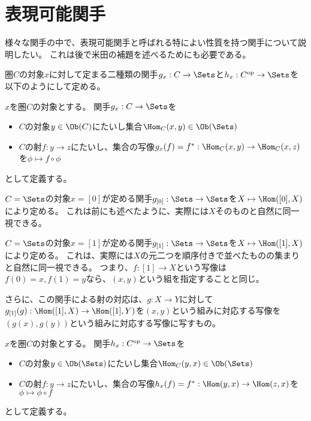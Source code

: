 \documentclass[uplatex]{jsarticle}
\begin{document}
\section{表現可能関手}
様々な関手の中で、表現可能関手と呼ばれる特によい性質を持つ関手について説明したい。
これは後で米田の補題を述べるためにも必要である。

圏$C$の対象$x$に対して定まる二種類の関手$g_x:C \to \Sets$と$h_x:C^{\rm op} \to \Sets$を以下のようにして定める。

\begin{dfn}
$x$を圏$C$の対象とする。
関手$g_x:C\to \Sets$を
\begin{itemize}
\item $C$の対象$y\in\Ob(C)$にたいし集合$\Hom_C(x,y)\in\Ob(\Sets)$
\item $C$の射$f:y\to z$にたいし、集合の写像$g_x(f)=f^*:\Hom_C(x,y)\to\Hom_C(x,z)$を$\phi\mapsto f\circ\phi$
\end{itemize}
として定義する。
\end{dfn}

\begin{eg}
$C=\Sets$の対象$x=[0]$が定める関手$g_{[0]}:\Sets \to \Sets$を$X \mapsto \Hom([0], X)$により定める。
これは前にも述べたように、実際には$X$そのものと自然に同一視できる。
\end{eg}

\begin{eg}
$C=\Sets$の対象$x=[1]$が定める関手$g_{[1]}:\Sets \to \Sets$を$X \mapsto \Hom([1], X)$により定める。
これは、実際には$X$の元二つを順序付きで並べたものの集まりと自然に同一視できる。
つまり、$f:[1] \to X$という写像は$f(0)=x, f(1)=y$なら、$(x,y)$という組を指定することと同じ。

さらに、この関手による射の対応は、$g:X \to Y$に対して$g_{[1]}(g):\Hom([1], X) \to \Hom([1], Y)$を$(x,y)$という組みに対応する写像を$(g(x), g(y))$という組みに対応する写像に写すもの。
\end{eg}

\begin{dfn}
$x$を圏$C$の対象とする。
関手$h_x:C^{\rm op}\to \Sets$を
\begin{itemize}
\item $C$の対象$y\in\Ob(\Sets)$にたいし集合$\Hom_C(y,x)\in\Ob(\Sets)$
\item $C$の射$f:y\to z$にたいし、集合の写像$h_x(f)=f^*:\Hom(y,x)\to\Hom(z,x)$を$\phi\mapsto \phi\circ f$
\end{itemize}
として定義する。
\end{dfn}
\end{document}
